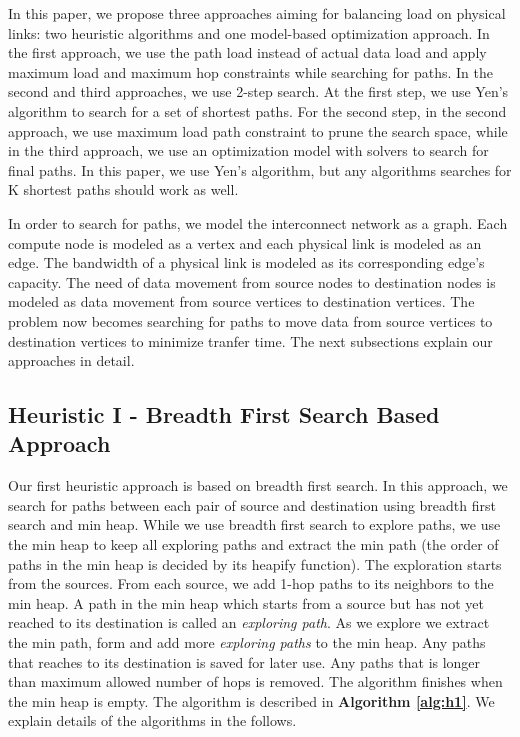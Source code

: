 In this paper, we propose three approaches aiming for balancing load on physical links: two heuristic algorithms and one model-based optimization approach. In the first approach, we use the path load instead of actual data load and apply maximum load and maximum hop constraints while searching for paths. In the second and third approaches, we use 2-step search. At the first step, we use Yen's algorithm \cite{Yen:Kpath} to search for a set of shortest paths. For the second step, in the second approach, we use maximum load path constraint to prune the search space, while in the third approach, we use an optimization model with solvers to search for final paths. In this paper, we use Yen's algorithm, but any algorithms searches for K shortest paths should work as well.

In order to search for paths, we model the interconnect network as a graph. Each compute node is modeled as a vertex and each physical link is modeled as an edge. The bandwidth of a physical link is modeled as its corresponding edge's capacity. The need of data movement from source nodes to destination nodes is modeled as data movement from source vertices to destination vertices. The problem now becomes searching for paths to move data from source vertices to destination vertices to minimize tranfer time. The next subsections explain our approaches in detail.

\subsection{Heuristic I - Breadth First Search Based Approach}

Our first heuristic approach is based on breadth first search. In this approach, we search for paths between each pair of source and destination using breadth first search and min heap. While we use breadth first search to explore paths, we use the min heap to keep all exploring paths and extract the min path (the order of paths in the min heap is decided by its heapify function). The exploration starts from the sources. From each source, we add 1-hop paths to its neighbors to the min heap. A path in the min heap which starts from a source but has not yet reached to its destination is called an \textit{exploring path}. As we explore we extract the min path, form and add more \textit{exploring paths} to the min heap. Any paths that reaches to its destination is saved for later use. Any paths that is longer than maximum allowed number of hops is removed. The algorithm finishes when the min heap is empty. The algorithm is described in \textbf{Algorithm \ref{alg:h1}}. We explain details of the algorithms in the follows.

